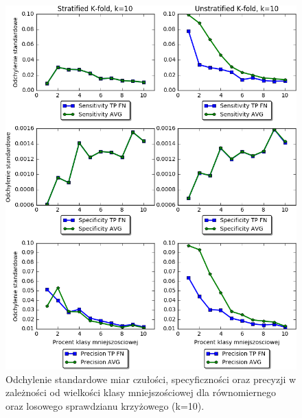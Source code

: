 \begin{figure}[H]
	\centering
	\includegraphics[width=\textwidth]{./images/stdwsk.png}
	\caption[Odchylenie standardowe miar dla sprawdzianu krzyżowego]{Odchylenie standardowe miar czułości, specyficzności oraz precyzji w zależności od wielkości klasy mniejszościowej dla równomiernego oraz losowego sprawdzianu krzyżowego (k=10).}
	\label{fig:wskaznikistd}
\end{figure}
\newpage
